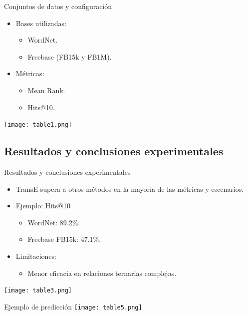 \documentclass{beamer}
\begin{document}
\begin{frame}{Conjuntos de datos y configuración}
    \begin{itemize}
        \item Bases utilizadas:
        \begin{itemize}
            \item WordNet.
            \item Freebase (FB15k y FB1M).
        \end{itemize}
        \item Métricas:
        \begin{itemize}
            \item Mean Rank.
            \item Hits@10.
        \end{itemize}
    \end{itemize}
    \vspace{0.5cm}
    \centering
    \texttt{[image: table1.png]} %
\end{frame}

\subsection{Resultados y conclusiones experimentales}

\begin{frame}{Resultados y conclusiones experimentales}
    \begin{itemize}
        \item TransE supera a otros métodos en la mayoría de las métricas y escenarios.
        \item Ejemplo: Hits@10
        \begin{itemize}
            \item WordNet: 89.2\%.
            \item Freebase FB15k: 47.1\%.
        \end{itemize}
        \item Limitaciones:
        \begin{itemize}
            \item Menor eficacia en relaciones ternarias complejas.
        \end{itemize}
    \end{itemize}
    \vspace{0.5cm}
    \centering
    \texttt{[image: table3.png]} %
\end{frame}
\begin{frame}{Ejemplo de predicción}
    \vspace{0.5cm}
    \centering
    \texttt{[image: table5.png]} %
\end{frame}
\end{document}
